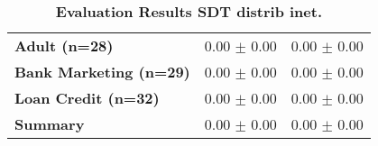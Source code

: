 \begin{table}[htb]
{\begin{tabular}{lll}
\textbf{Adult (n=28)                             } &  \phantom{0}0.00 $\pm$ \phantom{0}0.00 &             \phantom{0}0.00 $\pm$ \phantom{0}0.00 \\
\textbf{Bank Marketing (n=29)                    } &  \phantom{0}0.00 $\pm$ \phantom{0}0.00 &             \phantom{0}0.00 $\pm$ \phantom{0}0.00 \\
\textbf{Loan Credit (n=32)                       } &  \phantom{0}0.00 $\pm$ \phantom{0}0.00 &             \phantom{0}0.00 $\pm$ \phantom{0}0.00 \\
\midrule
\textbf{Summary                                  } &  \phantom{0}0.00 $\pm$ \phantom{0}0.00 &             \phantom{0}0.00 $\pm$ \phantom{0}0.00 \\
\bottomrule
\end{tabular}%
}
\caption{\textbf{Evaluation Results SDT distrib inet.}}
\label{tab:eval-results}
\end{table}
\newpage 


